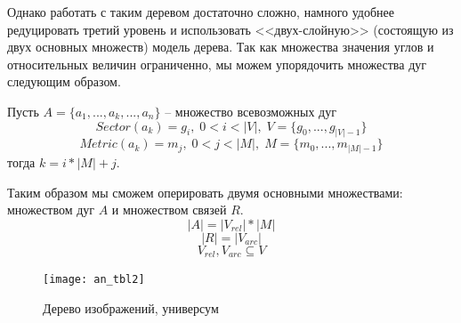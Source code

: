Однако работать с таким деревом достаточно сложно, намного удобнее редуцировать третий уровень и использовать <<двух-слойную>> (состоящую из двух основных множеств) модель дерева. Так как множества значения углов и относительных величин ограниченно, мы можем упорядочить множества дуг следующим образом.

Пусть $A = \{a_1, ..., a_k, ..., a_n\}$ -- множество всевозможных дуг
$$Sector(a_k) = g_i,\; 0 < i < |V|,\;V = \{g_0, ..., g_{|V|-1}\}$$
$$Metric(a_k) = m_j,\; 0 < j < |M|,\;M = \{m_0, ..., m_{|M|-1}\}$$
тогда $k = i*|M| + j$.

Таким образом мы сможем оперировать двумя основными множествами: множеством дуг $A$ и множеством связей $R$.
$$|A| = |V_{rel}|*|M|$$
$$|R| = |V_{arc}|$$
$$V_{rel}, V_{arc} \subseteq V$$

\begin{figure}[h]
\texttt{[image: an\_tbl2]}
\caption{Дерево изображений, универсум}
\label{universum}
\end{figure}

%
%
%
%

